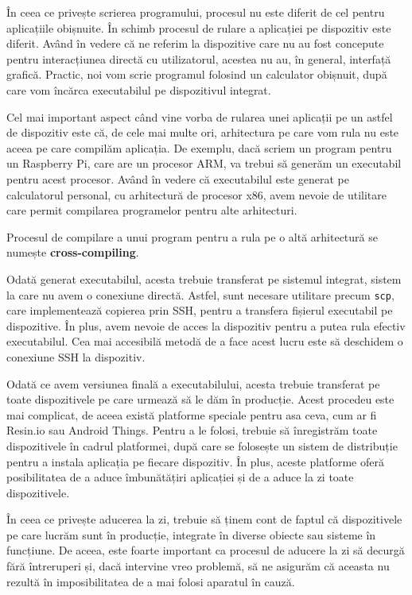 În ceea ce privește scrierea programului, procesul nu este diferit de cel pentru
aplicațiile obișnuite. În schimb procesul de rulare a aplicației pe dispozitiv
este diferit. Având în vedere că ne referim la dispozitive care nu au fost
concepute pentru interacțiunea directă cu utilizatorul, acestea nu au, în general,
interfață grafică. Practic, noi vom scrie programul folosind un calculator
obișnuit, după care vom încărca executabilul pe dispozitivul integrat.

Cel mai important aspect când vine vorba de rularea unei aplicații pe un astfel
de dispozitiv este că, de cele mai multe ori, arhitectura pe care vom rula nu este
aceea pe care compilăm aplicația. De exemplu, dacă scriem un program pentru un
Raspberry Pi, care are un procesor ARM, va trebui să generăm un executabil
pentru acest procesor. Având în vedere că executabilul este generat pe
calculatorul personal, cu arhitectură de procesor x86, avem nevoie de utilitare care permit
compilarea programelor pentru alte arhitecturi.

Procesul de compilare a unui program pentru a rula pe o altă arhitectură se
numește \textbf{cross-compiling}.

Odată generat executabilul, acesta trebuie transferat pe sistemul integrat,
sistem la care nu avem o conexiune directă. Astfel, sunt necesare utilitare
precum \texttt{scp}, care implementează copierea prin SSH, pentru a transfera fișierul executabil pe dispozitive. În plus, avem
nevoie de acces la dispozitiv pentru a putea rula efectiv executabilul. Cea mai
accesibilă metodă de a face acest lucru este să deschidem o conexiune SSH la
dispozitiv.

Odată ce avem versiunea finală a executabilului, acesta trebuie transferat pe
toate dispozitivele pe care urmează să le dăm în producție. Acest procedeu este
mai complicat, de aceea există platforme speciale pentru asa ceva, cum ar fi
Resin.io sau Android Things. Pentru a le folosi, trebuie să înregistrăm toate
dispozitivele în cadrul platformei, după care se folosește un sistem de
distribuție pentru a instala aplicația pe fiecare dispozitiv. În plus, aceste
platforme oferă posibilitatea de a aduce îmbunătățiri aplicației și de a aduce
la zi toate dispozitivele.

În ceea ce privește aducerea la zi, trebuie să ținem cont de faptul că
dispozitivele pe care lucrăm sunt în producție, integrate în diverse obiecte sau
sisteme în funcțiune. De aceea, este foarte important ca procesul de aducere la
zi să decurgă fără întreruperi și, dacă intervine vreo problemă, să ne
asigurăm că aceasta nu rezultă în imposibilitatea de a mai folosi aparatul în
cauză.

